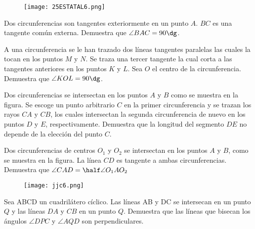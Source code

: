 \begin{figure}[!h]
    \centering
    \texttt{[image: 25ESTATAL6.png]}
\end{figure}

\begin{problem}[$4 \clubsuit$]
    Dos circunferencias son tangentes exteriormente en un punto
    $A$. $BC$ es una tangente común externa. 
    Demuestra que $\angle BAC = 90 \dg$.
\end{problem}

\begin{problem}[$5 \clubsuit$]
    A una circunferencia se le han trazado dos líneas tangentes
    paralelas las cuales la tocan en los puntos $M$ y $N$. 
    Se traza una tercer tangente la cual corta a las tangentes 
    anteriores en los puntos $K$ y $L$. Sea $O$ el centro de la 
    circunferencia. Demuestra que $\angle KOL = 90\dg $.
\end{problem}

\begin{problem}[$6 \clubsuit$]
    Dos circunferencias se intersectan en los puntos $A$ y $B$ 
    como se muestra en la figura. Se escoge un punto arbitrario 
    $C$ en la primer circunferencia y se trazan los rayos $CA$ 
    y $CB$, los cuales intersectan la segunda circunferencia
    de nuevo en los puntos $D$ y $E$, respectivamente. Demuestra 
    que la longitud del segmento $DE$ no depende de la elección 
    del punto $C$.
\end{problem}

\begin{problem}[$4 \clubsuit$]
    Dos circunferencias de centros $O_1$ y $O_2$ se intersectan 
    en los puntos $A$ y $B$, como se muestra en la figura. La 
    línea $CD$ es tangente a ambas circunferencias. Demuestra que
    $\angle CAD = \half \angle O_1AO_2$
\end{problem}

\begin{figure}[!h]
    \centering
    \texttt{[image: jjc6.png]}
\end{figure}

\begin{problem}[$7 \clubsuit$]
    \jp

    Sea ABCD un cuadrilátero cíclico. Las líneas AB y DC se 
    intersecan en un punto $Q$ y las líneas $DA$ y $CB$ en 
    un punto $Q$. Demuestra que las líneas que bisecan los 
    ángulos $\angle DPC$ y $\angle AQD$ son perpendiculares.
\end{problem}

